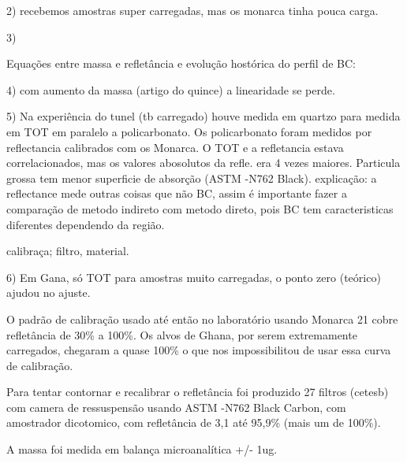 


2) recebemos amostras super carregadas, mas os monarca tinha pouca carga.

3) 

Equações entre massa e refletância e evolução hostórica do perfil de BC:

4) com aumento da massa (artigo do quince) a linearidade se perde. 

5) Na experiência do tunel (tb carregado) houve medida em quartzo para medida
em TOT em paralelo a policarbonato. Os policarbonato foram medidos por reflectancia
calibrados com os Monarca. O TOT e a refletancia estava correlacionados, mas
os valores abosolutos da refle. era 4 vezes maiores.
Particula grossa tem menor superficie de absorção (ASTM -N762 Black). 
explicação: a reflectance mede outras coisas que não BC, assim é importante
fazer a comparação de metodo indireto com metodo direto, pois BC tem caracteristicas
diferentes dependendo da região.

calibraça; filtro, material.

6) Em Gana, só TOT para amostras muito carregadas, o ponto zero (teórico)
ajudou no ajuste.

O padrão de calibração usado até então no laboratório usando Monarca 21 cobre refletância de 30\% a 100\%. 
Os alvos de Ghana, por serem extremamente carregados, chegaram a quase 100\% o que nos impossibilitou de usar 
essa curva de calibração.  

Para tentar contornar e recalibrar o refletância foi produzido 27 filtros (cetesb) com camera de ressuspensão
usando ASTM -N762 Black Carbon, com amostrador dicotomico, com refletância de 3,1 até 95,9\% (mais um de 100\%).

A massa foi medida em balança microanalítica +/- 1ug.




